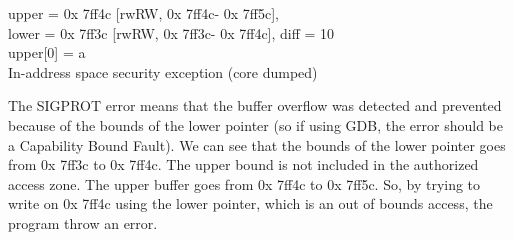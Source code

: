 \documentclass[a4paper, 11pt]{article}
\newcommand{\ptraddress}[1]{%
    0x\textcolor{gray}{\scalebox{0.9}{fffffff}}#1%
}
\begin{document}
\begin{tcolorbox}[colback=gray!5!white, colframe=blue!75!black, title=Output on an environment protected by CHERI]
	upper = \ptraddress{}7ff4c [rwRW,\ptraddress{}7ff4c-\ptraddress{}7ff5c],\\
    lower = \ptraddress{}7ff3c [rwRW,\ptraddress{}7ff3c-\ptraddress{}7ff4c], diff = 10\\
	upper[0] = a\\
	In-address space security exception (core dumped)
\end{tcolorbox}
The SIGPROT error means that the buffer overflow was detected and prevented because of the bounds of the lower pointer (so if using GDB, the error should be a Capability Bound Fault).
We can see that the bounds of the lower pointer goes from \ptraddress{}7ff3c to \ptraddress{}7ff4c. The upper bound is not included in the authorized access zone. 
The upper buffer goes from \ptraddress{}7ff4c to \ptraddress{}7ff5c. So, by trying to write on \ptraddress{}7ff4c using the lower pointer, which is an out of bounds access, the program throw an error.



\end{document}
